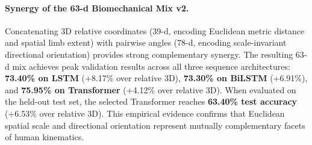 \documentclass[runningheads]{llncs}
\begin{document}
\paragraph{Synergy of the 63-d Biomechanical Mix v2.} Concatenating 3D relative coordinates (39-d, encoding Euclidean metric distance and spatial limb extent) with pairwise angles (78-d, encoding scale-invariant directional orientation) provides strong complementary synergy. The resulting 63-d mix achieves peak validation results across all three sequence architectures: \textbf{73.40\% on LSTM} (+8.17\% over relative 3D), \textbf{73.30\% on BiLSTM} (+6.91\%), and \textbf{75.95\% on Transformer} (+4.12\% over relative 3D). When evaluated on the held-out test set, the selected Transformer reaches \textbf{63.40\% test accuracy} (+6.53\% over relative 3D). This empirical evidence confirms that Euclidean spatial scale and directional orientation represent mutually complementary facets of human kinematics.

\begin{table}[!t]
\centering
\caption{Validation accuracy (\%) across sequence architectures for feature selection, with held-out test evaluation for the winning Transformer backbone ($\approx 350\text{K}$ parameters).}
\label{tab:table1}
\end{table}
\end{document}
